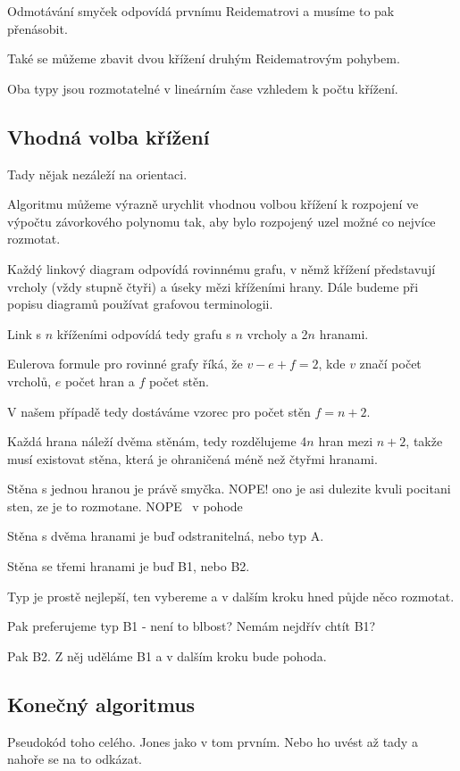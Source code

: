 Odmotávání smyček odpovídá prvnímu Reidematrovi a musíme to pak přenásobit.

Také se můžeme zbavit dvou křížení druhým Reidematrovým pohybem.

Oba typy jsou rozmotatelné v lineárním čase vzhledem k počtu křížení.

\subsection{Vhodná volba křížení}
Tady nějak nezáleží na orientaci.

Algoritmu můžeme výrazně urychlit vhodnou volbou křížení k rozpojení ve výpočtu závorkového polynomu tak, aby bylo rozpojený uzel možné co nejvíce rozmotat.

Každý linkový diagram odpovídá rovinnému grafu, v němž křížení představují vrcholy (vždy stupně čtyři) a úseky mězi kříženími hrany. Dále budeme při popisu diagramů používat grafovou terminologii.

Link s $n$ kříženími odpovídá tedy grafu s $n$ vrcholy a 2$n$ hranami.

Eulerova formule pro rovinné grafy říká, že $v - e +f = 2$, kde $v$ značí počet vrcholů, $e$ počet hran a $f$ počet stěn.

V našem případě tedy dostáváme vzorec pro počet stěn $f = n+2$.

Každá hrana náleží dvěma stěnám, tedy rozdělujeme 4$n$ hran mezi $n+2$, takže musí existovat stěna, která je ohraničená méně než čtyřmi hranami.

Stěna s jednou hranou je právě smyčka. NOPE! ono je asi dulezite kvuli pocitani sten, ze je to rozmotane. NOPE~ v pohode

Stěna s dvěma hranami je buď odstranitelná, nebo typ A.

Stěna se třemi hranami je buď B1, nebo B2.

Typ je prostě nejlepší, ten vybereme a v dalším kroku hned půjde něco rozmotat.

Pak preferujeme typ B1 - není to blbost? Nemám nejdřív chtít B1?

Pak B2. Z něj uděláme B1 a v dalším kroku bude pohoda.

\subsection{Konečný algoritmus}
Pseudokód toho celého. Jones jako v tom prvním. Nebo ho uvést až tady a nahoře se na to odkázat.

